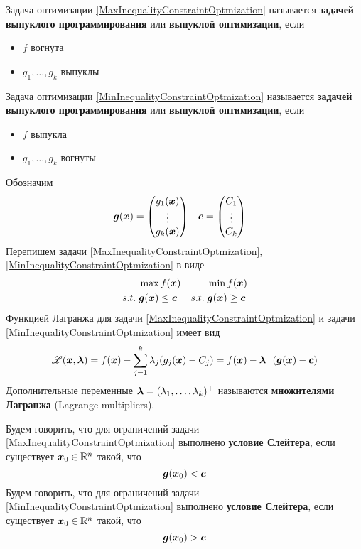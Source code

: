 \begin{definicion}
Задача оптимизации \eqref{MaxInequalityConstraintOptmization} называется 
\textbf{задачей выпуклого программирования} или \textbf{выпуклой оптимизации}, если
\begin{itemize}
	\item $f$ вогнута
	\item $g_1,\ldots,g_k$ выпуклы
\end{itemize}
\end{definicion}
\begin{definicion}
Задача оптимизации \eqref{MinInequalityConstraintOptmization} называется 
\textbf{задачей выпуклого программирования} или \textbf{выпуклой оптимизации}, если
\begin{itemize}
	\item $f$ выпукла
	\item $g_1,\ldots,g_k$ вогнуты
\end{itemize}
\end{definicion}
Обозначим
\begin{align*}
	{\bm g}({\bm x})&=\begin{pmatrix}
		g_1({\bm x}) \\ \vdots \\ g_k({\bm x})
	\end{pmatrix} & {\bm c}&=\begin{pmatrix}
		C_1 \\ \vdots \\ C_k
	\end{pmatrix}
\end{align*}
Перепишем задачи \eqref{MaxInequalityConstraintOptmization},
\eqref{MinInequalityConstraintOptmization} в виде
\begin{align*}
	&\max f({\bm x}) & &\min f({\bm x}) \\
	s.t.\;&{\bm g}({\bm x})\leq {\bm c}  &
	s.t.\;&{\bm g}({\bm x})\geq {\bm c} 
\end{align*}
Функцией Лагранжа для задачи \eqref{MaxInequalityConstraintOptmization} и задачи
\eqref{MinInequalityConstraintOptmization} имеет вид
\[
	{\mathscr L}({\bm x},{\bm{ \lambda}})=f({\bm x})-\sum_{j=1}^k\lambda_j(g_j({\bm x})-C_j)=
	f({\bm x})-{\bm{ \lambda}}^\top({\bm g}({\bm x})-{\bm c})
\]
Дополнительные переменные ${\bm{ \lambda}}=(\lambda_1,\ldots,\lambda_k)^\top$ называются
\textbf{множителями Лагранжа} (Lagrange multipliers). 
\begin{definicion}
Будем говорить, что для ограничений задачи \eqref{MaxInequalityConstraintOptmization} выполнено
\textbf{условие Слейтера}, если существует ${\bm x}_0\in{\mathbb R}^n$ такой, что
\[
	{\bm g}({\bm x}_0)<{\bm c}
\]
Будем говорить, что для ограничений задачи \eqref{MinInequalityConstraintOptmization} выполнено
\textbf{условие Слейтера}, если существует ${\bm x}_0\in{\mathbb R}^n$ такой, что 
\[
	{\bm g}({\bm x}_0)>{\bm c}
\]
\end{definicion}
